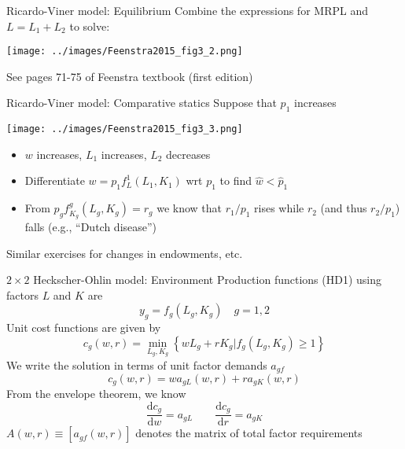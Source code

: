 \documentclass[10pt,notes=hide]{beamer}
\begin{document}
\begin{frame}{Ricardo-Viner model: Equilibrium}
Combine the expressions for MRPL and $L = L_1 + L_2$ to solve:
\begin{center}\texttt{[image: ../images/Feenstra2015\_fig3\_2.png]}\end{center}
See pages 71-75 of Feenstra textbook (first edition)
\end{frame}
\begin{frame}{Ricardo-Viner model: Comparative statics}
Suppose that $p_1$ increases
\begin{center}\texttt{[image: ../images/Feenstra2015\_fig3\_3.png]}\end{center}
\begin{itemize}
	\item $w$ increases, $L_1$ increases, $L_2$ decreases
	\item Differentiate $w=p_1 f^1_{L} \left(L_1,K_1\right)$ wrt $p_1$ to find $\hat{w}<\hat{p}_1$
	\item From $p_g f^g_{K_g}\left(L_g,K_g\right) = r_g $ we know that $r_1/p_1$ rises while $r_2$ (and thus $r_2/p_1$) falls (e.g., ``Dutch disease'')
\end{itemize}
Similar exercises for changes in endowments, etc.
\end{frame}
\begin{frame}{$2 \times 2$ Heckscher-Ohlin model: Environment}
Production functions (HD1) using factors $L$ and $K$ are
\begin{equation*}
y_{g}=f_{g}\left( L_{g},K_{g}\right) \quad g=1,2
\end{equation*}
Unit cost functions are given by
\begin{equation*}
c_{g}\left( w,r\right) =\min_{L_{g},K_{g}}\left\{ wL_{g}+rK_{g}|f_{g}\left(
L_{g},K_{g}\right) \geq 1\right\}
\end{equation*}
We write the solution in terms of unit factor demands $a_{gf}$
\begin{equation*}
c_{g}\left( w,r\right) =wa_{gL}\left( w,r\right) +ra_{gK}\left( w,r\right)
\end{equation*}
From the envelope theorem, we know
\begin{equation*}
\frac{\textrm{d} c_{g}}{\textrm{d} w}=a_{gL} \qquad \frac{\textrm{d} c_{g}}{\textrm{d} r}=a_{gK}
\end{equation*}
$A(w,r)\equiv [a_{gf}(w,r)]$ denotes the matrix of total factor requirements
\end{frame}
\end{document}
